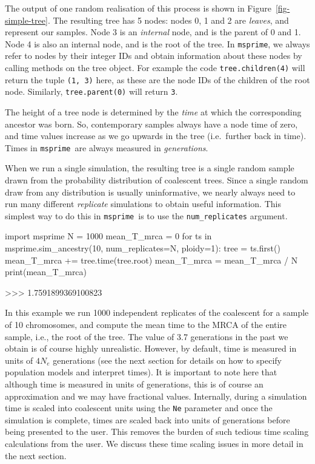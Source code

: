 \documentclass[graybox]{svmult}
\newcommand{\msprime}[0]{\texttt{msprime}}
\begin{document}
The output of one random realisation of this process is shown in
Figure~\ref{fig-simple-tree}. The resulting tree has 5 nodes: nodes 0, 1 and 2 are \emph{leaves}, and
represent our samples. Node 3 is an \emph{internal} node, and is the
parent of 0 and 1. Node 4 is also an internal node, and is the root of
the tree. In \msprime, we always refer to nodes by their integer IDs and
obtain information about these nodes by calling methods on the tree
object. For example the code \texttt{tree.children(4)} will return the
tuple \texttt{(1,\ 3)} here, as these are the node IDs of the children
of the root node. Similarly, \texttt{tree.parent(0)} will return
\texttt{3}.

The height of a tree node is determined by the \emph{time} at which the corresponding
ancestor was born. So,
contemporary samples always have a node time of zero, and time values
increase as we go upwards in the tree (i.e.\ further back in time). Times
in \msprime\ are always measured in \emph{generations}.

When we run a single simulation, the resulting tree is a single random
sample drawn from the probability distribution of coalescent trees. Since a
single random draw from any distribution is usually uninformative, we
nearly always need to run many different \emph{replicate} simulations to
obtain useful information. This simplest way to do this in \msprime\ is to
use the \texttt{num\_replicates} argument.

\begin{pythoncode}
import msprime
N = 1000
mean_T_mrca = 0
for ts in msprime.sim_ancestry(10, num_replicates=N, ploidy=1):
    tree = ts.first()
    mean_T_mrca += tree.time(tree.root)
mean_T_mrca = mean_T_mrca / N
print(mean_T_mrca)

>>> 1.7591899369100823
\end{pythoncode}

    In this example we run 1000 independent replicates of the coalescent for
a sample of 10 chromosomes, and compute the mean time to the MRCA of the entire sample, i.e., the root of the
tree. The value of 3.7 generations in the past we obtain is of course highly unrealistic.
However, by default, time is measured in units of \(4 N_e\) generations (see the next section for details on how to
specify population models and interpret times). It is important to note here
that although time is measured in units of generations, this is of course
an approximation and we may have fractional values. Internally,
during a simulation time is scaled into coalescent units
using the \texttt{Ne} parameter and once the
simulation is complete, times are scaled back into units of generations
before being presented to the user. This removes the burden of such
tedious time scaling calculations from the user. We discuss these time
scaling issues in more detail in the next section.
\end{document}
